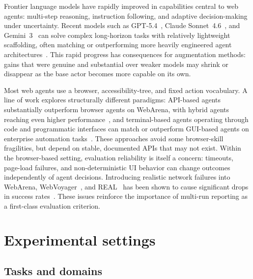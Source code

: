  Frontier language models have rapidly improved in capabilities central to web agents: multi-step reasoning, instruction following, and adaptive decision-making under uncertainty.
Recent models such as GPT-5.4~\citep{openai-2026-gpt54}, Claude Sonnet~4.6~\citep{anthropic-2026-sonnet46}, and Gemini~3~\citep{gemini-team-2025-gemini3} can solve complex long-horizon tasks with relatively lightweight scaffolding, often matching or outperforming more heavily engineered agent architectures~\citep{bechard-etal-2026-terminal}.
This rapid progress has consequences for augmentation methods: gains that were genuine and substantial over weaker models may shrink or disappear as the base actor becomes more capable on its own.

Most web agents use a browser, accessibility-tree, and fixed action vocabulary.
A line of work explores structurally different paradigms: API-based agents substantially outperform browser agents on WebArena, with hybrid agents reaching even higher performance~\citep{song-etal-2025-beyond}, and terminal-based agents operating through code and programmatic interfaces can match or outperform GUI-based agents on enterprise automation tasks~\citep{bechard-etal-2026-terminal}.
These approaches avoid some browser-skill fragilities, but depend on stable, documented APIs that may not exist.
Within the browser-based setting, evaluation reliability is itself a concern: timeouts, page-load failures, and non-deterministic UI behavior can change outcomes independently of agent decisions. Introducing realistic network failures into WebArena, WebVoyager~\citep{he-etal-2024-webvoyager}, and REAL~\citep{garg2025realbenchmarkingautonomousagents} has been shown to cause significant drops in success rates~\citep{kara-etal-2025-warex}.
These issues reinforce the importance of multi-run reporting as a first-class evaluation criterion.


\section{Experimental settings}
\label{sec:setup}

\subsection{Tasks and domains}

